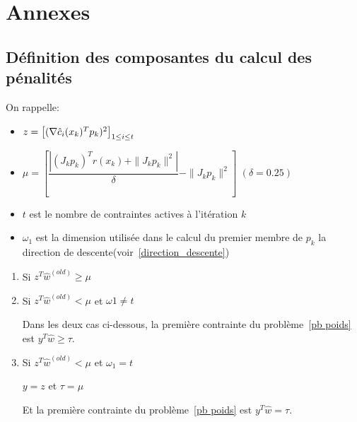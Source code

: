 \chapter*{Annexes}\label{Annexes}

\section*{Définition des composantes du calcul des pénalités}

On rappelle:
\begin{itemize}
    \item $z=\left[(\nabla \hat c_i(x_{k})^Tp_{k})^2 \right]_{1 \leq i \leq t}$ 
    \item $\mu =  \left[\dfrac{|(J_{k}p_{k})^Tr(x_k) + \|J_{k}p_{k}\|^2|}{\delta} - \|J_{k}p_{k}\|^2 \right]$ $(\delta=0.25)$
    \item $t$ est le nombre de contraintes actives à l'itération $k$
    \item $\omega_1$ est la dimension utilisée dans le calcul du premier membre de $p_k$ la direction de descente(voir~\ref{direction_descente})
\end{itemize}

\begin{enumerate}
    \item
    Si $z^{T}\hat{w}^{(old)} \geq \mu$
     
     \begin{algorithmic}
     \ELSE
     \ENDIF
     \ENDFOR
     \end{algorithmic}
     
     \item
    Si $z^{T}\hat{w}^{(old)} < \mu$ et $\omega{1}\neq t$
    
     \begin{algorithmic}
     \STATE{$\tau = \mu$}
     \ELSE
     \ENDIF
     \ENDFOR
     \end{algorithmic}
     
   Dans les deux cas ci-dessous, la première contrainte du problème~\ref{pb poids} est $y^{T}\hat{w} \geq \tau$.
    
    \item
    Si $z^{T}\hat{w}^{(old)} < \mu$ et $\omega_{1}= t$
    \begin{algorithmic}
        \STATE $y = z$ et $\tau = \mu$ 
    \end{algorithmic}
    
    Et la première contrainte du problème~\ref{pb poids} est $y^{T}\hat{w} = \tau$.
    
    \end{enumerate}
     

